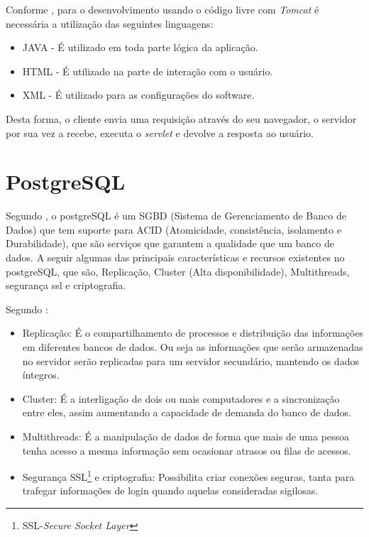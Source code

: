 	\par Conforme , para o desenvolvimento usando o código
livre com \textit{Tomcat} é necessária a utilização das seguintes linguagens:
	\begin{itemize}
	  
	  \item JAVA - É utilizado em toda parte lógica da aplicação.
	  
	  \item HTML - É utilizado na parte de interação com o usuário.
	  
	  \item XML - É utilizado para as configurações do software. 
	
	\end{itemize}
 
 
 
	\par Desta forma, o cliente envia uma requisição através do seu navegador, o
servidor por sua vez a recebe, executa o \textit{servlet} e devolve a resposta
ao usuário.

\section{PostgreSQL}

\par Segundo , o postgreSQL é um SGBD (Sistema de
Gerenciamento de Banco de Dados) que tem suporte para ACID (Atomicidade,
consistência, isolamento e Durabilidade), que são serviços que garantem a
qualidade que um banco de dados. A seguir algumas das principais
características e recursos existentes no postgreSQL, que são, Replicação,
Cluster (Alta disponibilidade), Multithreads, segurança ssl e criptografia.

\par Segundo :
	\begin{itemize}
	  
	  \item Replicação: É o compartilhamento de processos e distribuição das
	  informações em diferentes bancos de dados. Ou seja as informações que serão
	  armazenadas no servidor serão replicadas para um servidor secundário,
	  mantendo os dados íntegros.
	  
	  \item Cluster: É a interligação de dois ou mais computadores e a
	  sincronização entre eles, assim aumentando a capacidade de demanda do banco
	  de dados. 
	  
	  \item Multithreads: É a manipulação de dados de forma que mais de uma pessoa
	  tenha acesso a mesma informação sem ocasionar atrasos ou filas de acessos.
	  
	  \item Segurança SSL\footnote{SSL-\textit{Secure Socket Layer}}%
	   e criptografia: Possibilita criar conexões seguras,
	  tanta para trafegar informações de login quando aquelas consideradas sigilosas.
   
	\end{itemize}
	
